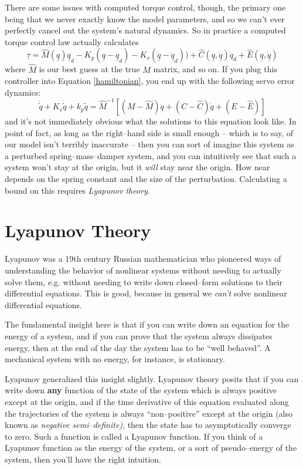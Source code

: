 \documentclass[]{article}
\begin{document}
There are some issues with computed torque control, though, the primary one being that we never exactly know the model parameters, and so we can't ever perfectly cancel out the system's natural dynamics. So in practice a computed torque control law actually calculates
\begin{displaymath}
 \underline{\tau} = \hat{M}(\underline{q}) \ddot{\underline{q}}_{d}- K_{p}(\underline{q} - \underline{q}_{d}) - K_{v}(\underline{\dot{q}} - \underline{\dot{q}}_{d})) + \hat{C}(\underline{q}, \underline{\dot{q}})\dot{q}_{d} + \hat{E}(\underline{q}, \underline{\dot{q}})  
\end{displaymath}
where $\hat{M}$ is our best guess at the true $M$ matrix, and so on. If you plug this controller into Equation \ref{hamiltonian}, you end up with the following servo error dynamics:
\begin{displaymath}
 \ddot{\tilde{q}} + K_{v}\dot{\tilde{q}} + k_{p}\tilde{q} = \hat{M}^{-1}\left[(M-\hat{M})\ddot{q} + (C-\hat{C})\dot{q} + (E-\hat{E})\right]
\end{displaymath}
and it's not immediately obvious what the solutions to this equation look like. In point of fact, as long as the right--hand side is small enough -- which is to say, of our model isn't terribly inaccurate -- then you can sort of imagine this system as a perturbed spring--mass--damper system, and you can intuitively see that such a system won't stay at the origin, but it \textit{will} stay near the origin. How near depends on the spring constant and the size of the perturbation. Calculating a bound on this requires \textit{Lyapunov theory}.

\section{Lyapunov Theory}
Lyapunov was a 19th century Russian mathematician who pioneered ways of understanding the behavior of nonlinear systems without needing to actually solve them, e.g. without needing to write down closed--form solutions to their differential equations. This is good, because in general we \textit{can't} solve nonlinear differential equations.

The fundamental insight here is that if you can write down an equation for the energy of a system, and if you can prove that the system always dissipates energy, then at the end of the day the system has to be ``well behaved''. A mechanical system with no energy, for instance, is stationary.

Lyapunov generalized this insight slightly. Lyapunov theory posits that if you can write down \textbf{any} function of the state of the system which is always positive except at the origin, and if the time derivative of this equation evaluated along the trajectories of the system is always ``non--positive'' except at the origin (also known as \textit{negative semi--definite)}, then the state has to asymptotically converge to zero. Such a function is called a Lyapunov function. If you think of a Lyapunov function as the energy of the system, or a sort of pseudo--energy of the system, then you'll have the right intuition.
\end{document}
